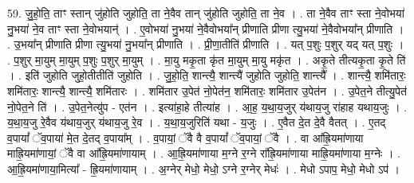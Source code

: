 \documentclass[17pt]{extarticle}
\begin{document}
59. जु॒हो॒ति॒ ताꣳ स्तान् जु॑होति जुहोति॒ ता ने॒वैव तान् जु॑होति जुहोति॒ ता ने॒व । . ता ने॒वैव ताꣳ स्ता ने॒वोभया॑ नु॒भया॑ ने॒व ताꣳ स्ता ने॒वोभयान्॑ । . ए॒वोभया॑ नु॒भया॑ ने॒वैवोभया᳚न् प्रीणाति प्रीणा त्यु॒भया॑ ने॒वैवोभया᳚न् प्रीणाति । . उ॒भया᳚न् प्रीणाति प्रीणा त्यु॒भया॑ नु॒भया᳚न् प्रीणाति । . प्री॒णा॒तीति॑ प्रीणाति । . यत् प॒शुः प॒शुर् यद् यत् प॒शुः । . प॒शुर् मा॒युम् मा॒युम् प॒शुः प॒शुर् मा॒युम् । . मा॒यु मकृ॒ता कृ॑त मा॒युम् मा॒यु मकृ॑त । . अकृ॒ते तीत्यकृ॒ता कृ॒ते ति॑ । . इति॑ जुहोति जुहो॒तीतीति॑ जुहोति । . जु॒हो॒ति॒ शान्त्यै॒ शान्त्यै॑ जुहोति जुहोति॒ शान्त्यै᳚ । . शान्त्यै॒ शमि॑तारः॒ शमि॑तारः॒ शान्त्यै॒ शान्त्यै॒ शमि॑तारः । . शमि॑तार उ॒पेत॑ नो॒पेत॑न॒ शमि॑तारः॒ शमि॑तार उ॒पेत॑न । . उ॒पेत॒ने तीत्यु॒पेत॑ नो॒पेत॒ने ति॑ । . उ॒पेत॒नेत्यु॑प - एत॑न । . इत्या॑हा॒हे तीत्या॑ह । . आ॒ह॒ य॒था॒य॒जुर् य॑थाय॒जु रा॑हाह यथाय॒जुः । . य॒था॒य॒जु रे॒वैव य॑थाय॒जुर् य॑थाय॒जु रे॒व । . य॒था॒य॒जुरिति॑ यथा - य॒जुः । . ए॒वैत दे॒त दे॒वै वैतत् । . ए॒तद् व॒पायां᳚ ॅव॒पाया॑ मे॒त दे॒तद् व॒पाया᳚म् । . व॒पायां॒ ॅवै वै व॒पायां᳚ ॅव॒पायां॒ ॅवै । . वा आ᳚ह्रि॒यमा॑णाया माह्रि॒यमा॑णायां॒ ॅवै वा आ᳚ह्रि॒यमा॑णायाम् । . आ॒ह्रि॒यमा॑णाया म॒ग्ने र॒ग्ने रा᳚ह्रि॒यमा॑णाया माह्रि॒यमा॑णाया म॒ग्नेः । . आ॒ह्रि॒यमा॑णाया॒मित्या᳚ - ह्रि॒यमा॑णायाम् । . अ॒ग्नेर् मेधो॒ मेधो॒ ऽग्ने र॒ग्नेर् मेधः॑ । . मेधो ऽपाप॒ मेधो॒ मेधो ऽप॑ । \newline
\end{document}
